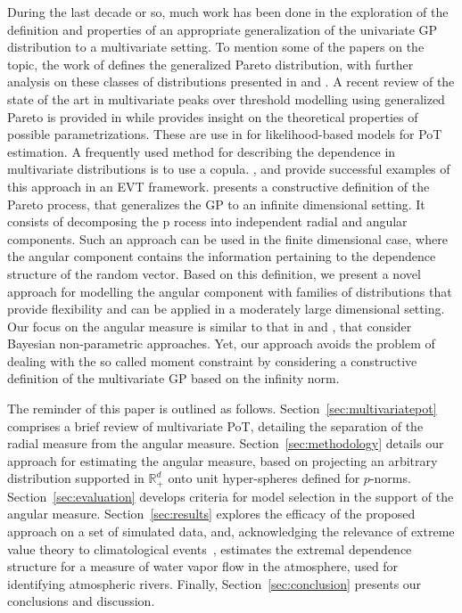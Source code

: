 During the last decade or so, much work has been done in the exploration of the definition 
  and properties of an appropriate generalization of the univariate GP distribution 
  to a multivariate setting.  To mention some of the papers on the topic, the work of
  \citep{rootzen2006} defines the generalized Pareto distribution, with further analysis on these classes
  of distributions presented in \cite{falk2008} and \cite{michel2008}.  A recent review of the state
  of the art in multivariate peaks over threshold modelling using generalized Pareto is provided in
  \cite{rootzen2018} while \cite{RoSeWa2018a} provides insight on the theoretical properties of possible
  parametrizations. These are use in \cite{KiRoSeWa2019} for likelihood-based models for PoT estimation.
  A frequently used method for describing the dependence
  in multivariate distributions is to use a copula. \cite{renard2007}, and \cite{falk2019} provide successful 
  examples of this approach in an EVT framework. \cite{ferreira2014} presents a constructive definition of the
  Pareto process, that generalizes the GP to an infinite dimensional setting. It consists of decomposing the p
  rocess into independent radial and angular components. Such an approach can be used in the finite dimensional 
  case, where the angular component 
  contains the information pertaining to the dependence structure of the random vector.
  Based on this definition, we present a novel approach for modelling  the angular component
  with families of distributions that provide flexibility and can be applied in a moderately large dimensional setting.
  Our focus on the angular measure is similar to that in \cite{SaNa2014} and \cite{HaCaCh2017}, that consider Bayesian 
  non-parametric approaches. Yet, our approach avoids the problem of dealing with the so called moment constraint by
  considering a constructive definition of the multivariate GP based on the infinity norm.
  
  The reminder of this paper is outlined as follows. Section~\ref{sec:multivariatepot} comprises a brief review of multivariate PoT, detailing the separation of the radial measure from the angular measure.
  Section~\ref{sec:methodology} details our approach for estimating the angular measure, based on projecting an arbitrary distribution supported in ${\mathbb R}_+^d$ onto unit hyper-spheres defined for $p$-norms. Section~\ref{sec:evaluation} develops criteria for model selection in the support of the angular measure.  Section~\ref{sec:results} explores the efficacy of the proposed approach on a set of simulated data, and, acknowledging the relevance of extreme value theory to climatological events~\citep{jentsch2007,vousdoukas2018,li2019}, estimates the extremal dependence structure for a measure of water vapor flow in the atmosphere, used for identifying atmospheric rivers.  Finally, Section~\ref{sec:conclusion} presents our conclusions and discussion.

